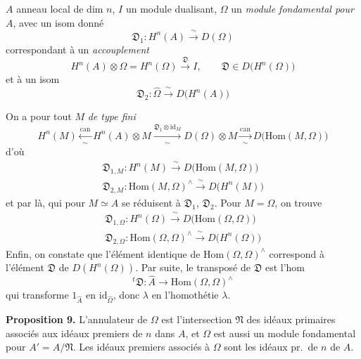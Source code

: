 \documentclass[11pt,a4paper]{article}
\begin{document}
$A$ anneau local de dim $n$, $I$ un module dualisant, $\Omega$ un
\emph{module fondamental pour $A$}, avec un isom donné
\[
  \boxed{\mathfrak{D}_1 : H^n(A) \xrightarrow{\ \sim\ } D(\Omega)}
\]
correspondant à un \emph{accouplement}
\[
  \boxed{H^n(A) \otimes \Omega = H^n(\Omega) \xrightarrow{\ \mathfrak{D}\ } I ,
  \qquad \mathfrak{D} \in D\bigl(H^n(\Omega)\bigr)}
\]
et à un isom
\[
  \mathfrak{D}_2 : \hat{\Omega} \xrightarrow{\ \sim\ } D\bigl(H^n(A)\bigr)
\]

On a pour tout $M$ \emph{de type fini}
\[
  \boxed{H^n(M) \xleftarrow[\ \sim\ ]{\mathrm{can}} H^n(A) \otimes M}
  \xrightarrow[\ \sim\ ]{\mathfrak{D}_1 \otimes \mathrm{id}_M}
  D(\Omega) \otimes M \xrightarrow[\ \sim\ ]{\mathrm{can}}
  D\bigl(\mathrm{Hom}(M, \Omega)\bigr)
\]
d'où
\[
  \boxed{\begin{array}{l}
    \mathfrak{D}_{1,M} : H^n(M) \xrightarrow{\ \sim\ }
      D\bigl(\mathrm{Hom}(M, \Omega)\bigr) \\
    \mathfrak{D}_{2,M} : \mathrm{Hom}(M, \Omega)^{\wedge}
      \xrightarrow{\ \sim\ } D\bigl(H^n(M)\bigr)
  \end{array}}
\]
et par là, qui pour $M \simeq A$ se réduisent à $\mathfrak{D}_1$,
$\mathfrak{D}_2$. Pour $M = \Omega$, on trouve
\[
  \begin{array}{l}
    \mathfrak{D}_{1,\Omega} : H^n(\Omega) \xrightarrow{\ \sim\ }
      D\bigl(\mathrm{Hom}(\Omega, \Omega)\bigr) \\
    \mathfrak{D}_{2,\Omega} : \mathrm{Hom}(\Omega, \Omega)^{\wedge}
      \xrightarrow{\ \sim\ } D\bigl(H^n(\Omega)\bigr)
  \end{array}
\]
Enfin, on constate que l'élément identique de
$\mathrm{Hom}(\Omega, \Omega)^{\wedge}$ correspond à l'élément
$\mathfrak{D}$ de $D(H^n(\Omega))$. Par suite, le transposé de
$\mathfrak{D}$ est l'hom
\[
  {}^t\mathfrak{D} : \hat{A} \longrightarrow \mathrm{Hom}(\Omega, \Omega)^{\wedge}
\]
qui transforme $1_{\hat{A}}$ en $\mathrm{id}_{\hat{\Omega}}$, donc
$\lambda$ en l'homothétie $\lambda$.

\textbf{Proposition 9.} L'annulateur de $\Omega$ est l'intersection
$\mathfrak{N}$ des idéaux primaires associés aux idéaux premiers de
 $n$ dans $A$, et $\Omega$ est aussi un module
fondamental pour $A' = A/\mathfrak{N}$. Les idéaux premiers associés à
$\Omega$ sont les idéaux pr.\ de  $n$ de $A$.
\end{document}
